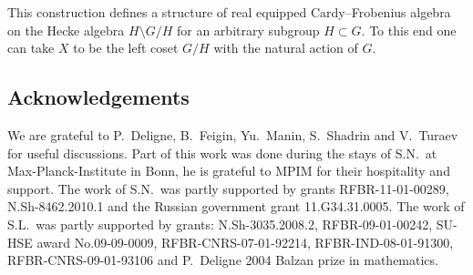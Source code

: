 \documentclass[pdftex]{sigma}
\begin{document}
\begin{note}
This construction def\/ines a structure of real equipped Cardy--Frobenius algebra on
the Hecke algebra $H\setminus G /H$ for an arbitrary subgroup $H \subset G$.
To this end one can take $X$  to be the left coset
$G/H$ with the
natural action of $G$.
\end{note}

\subsection*{Acknowledgements}

We are grateful to P.~Deligne, B.~Feigin, Yu.~Manin, S.~Shadrin and V.~Turaev for useful discussions.
Part of this work was done during the stays of S.N.\  at
Max-Planck-Institute in Bonn,
he is grateful to MPIM for their hospitality and support.
The work of S.N.\ was partly supported by grants RFBR-11-01-00289,
N.Sh-8462.2010.1 and the Russian government grant 11.G34.31.0005. The work of S.L.\  was partly supported by grants:
N.Sh-3035.2008.2,  RFBR-09-01-00242, SU-HSE award No.09-09-0009, RFBR-CNRS-07-01-92214, RFBR-IND-08-01-91300,
 RFBR-CNRS-09-01-93106 and P.~Deligne 2004 Balzan prize in mathematics.
\end{document}
